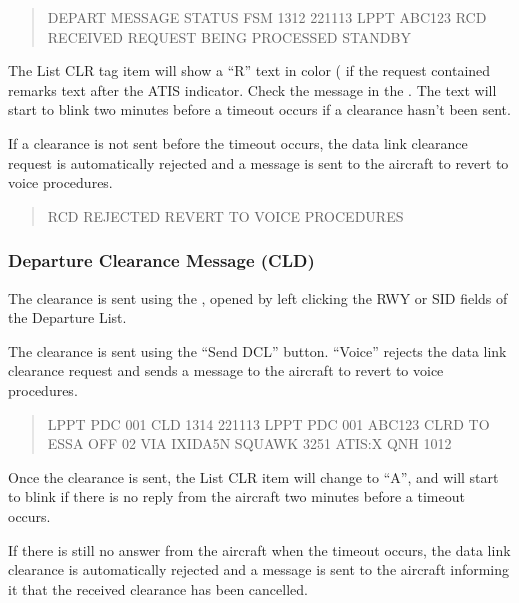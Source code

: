 \documentclass[a4paper,oneside,11pt]{memoir}
\begin{document}
\begin{quote}
  DEPART MESSAGE STATUS FSM 1312 221113 LPPT ABC123 RCD RECEIVED REQUEST BEING PROCESSED STANDBY 
\end{quote}

The List CLR tag item will show a “R” text in  color ( if the request contained remarks text after the ATIS indicator. Check the message in the . The text will start to blink two minutes before a timeout occurs if a clearance hasn’t been sent.

\bigskip

If a clearance is not sent before the timeout occurs, the data link clearance request is automatically rejected and a message is sent to the aircraft to revert to voice procedures.

\begin{quote}
  RCD REJECTED REVERT TO VOICE PROCEDURES
\end{quote}

\subsubsection{Departure Clearance Message (CLD)}

The clearance is sent using the , opened by left clicking the RWY or SID fields of the Departure List. 


The clearance is sent using the “Send DCL” button. “Voice” rejects the data link clearance request and sends a message to the aircraft to revert to voice procedures. 

\begin{quote}
  LPPT PDC 001 CLD 1314 221113 LPPT PDC 001 ABC123 CLRD TO ESSA OFF 02 VIA IXIDA5N SQUAWK 3251 ATIS:X QNH 1012
\end{quote}

Once the clearance is sent, the List CLR item will change to “A”, and will start to blink if there is no reply from the aircraft two minutes before a timeout occurs.

\bigskip

If there is still no answer from the aircraft when the timeout occurs, the data link clearance is automatically rejected and a message is sent to the aircraft informing it that the received clearance has been cancelled.
\end{document}
